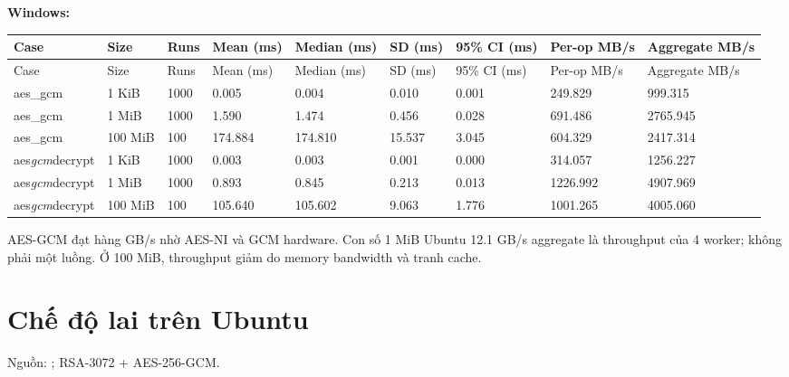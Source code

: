 \documentclass[12pt,a4paper,oneside]{report}
\let\origtexttt\texttt
\renewcommand{\texttt}[1]{\origtexttt{\seqsplit{#1}}}
\begin{document}
\textbf{Windows:}


\begin{longtable}{p{}p{}p{}p{}p{}p{}p{}p{}p{}}
\toprule
Case & Size & Runs & Mean (ms) & Median (ms) & SD (ms) & 95\% CI (ms) & Per-op MB/s & Aggregate MB/s \\
\midrule
\endfirsthead
\toprule
Case & Size & Runs & Mean (ms) & Median (ms) & SD (ms) & 95\% CI (ms) & Per-op MB/s & Aggregate MB/s \\
\midrule
\endhead
aes\_gcm & 1 KiB & 1000 & 0.005 & 0.004 & 0.010 & 0.001 & 249.829 & 999.315 \\
aes\_gcm & 1 MiB & 1000 & 1.590 & 1.474 & 0.456 & 0.028 & 691.486 & 2765.945 \\
aes\_gcm & 100 MiB & 100 & 174.884 & 174.810 & 15.537 & 3.045 & 604.329 & 2417.314 \\
aes\emph{gcm}decrypt & 1 KiB & 1000 & 0.003 & 0.003 & 0.001 & 0.000 & 314.057 & 1256.227 \\
aes\emph{gcm}decrypt & 1 MiB & 1000 & 0.893 & 0.845 & 0.213 & 0.013 & 1226.992 & 4907.969 \\
aes\emph{gcm}decrypt & 100 MiB & 100 & 105.640 & 105.602 & 9.063 & 1.776 & 1001.265 & 4005.060 \\
\bottomrule
\end{longtable}


AES-GCM đạt hàng GB/s nhờ AES-NI và GCM hardware. Con số 1 MiB Ubuntu 12.1 GB/s aggregate là throughput của 4 worker; không phải một luồng. Ở 100 MiB, throughput giảm do memory bandwidth và tranh cache.


\section{Chế độ lai trên Ubuntu}


Nguồn: \texttt{summary\_gcc.csv}; RSA-3072 + AES-256-GCM.
\end{document}

